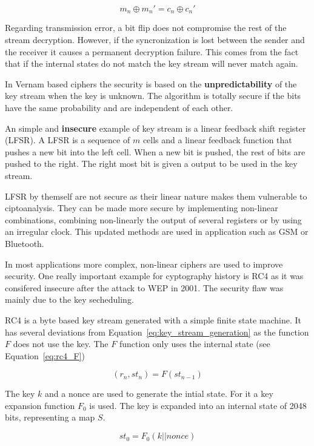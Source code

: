 \begin{equation}
m_n \oplus m_n' = c_n \oplus c_n'
\label{eq:nonce_repetition_keystream}
\end{equation}

Regarding transmission error, a bit flip does not compromise the rest of the stream decryption.
However, if the syncronization is lost between the sender and the receiver it causes a permanent decryption failure.
This comes from the fact that if the internal states do not match the key stream will never match again.

In Vernam based ciphers the security is based on the \textbf{unpredictability} of the key stream when the key is unknown.
The algorithm is totally secure if the bits have the same probability and are independent of each other.

An simple and \textbf{insecure} example of key stream is a linear feedback shift register (LFSR).
A LFSR is a sequence of $m$ cells and a linear feedback function that pushes a new bit into the left cell.
When a new bit is pushed, the rest of bits are pushed to the right.
The right most bit is given a output to be used in the key stream.

LFSR by themself are not secure as their linear nature makes them vulnerable to ciptoanalysis.
They can be made more secure by implementing non-linear combinations, combining non-linearly the output of several registers or by using an irregular clock.
This updated methods are used in application such as GSM or Bluetooth.

In most applications more complex, non-linear ciphers are used to improve security.
One really important example for cyptography history is RC4 as it was consifered insecure after the attack to WEP in 2001.
The security flaw was mainly due to the key secheduling.

RC4 is a byte based key stream generated with a simple finite state machine.
It has several deviations from Equation~\ref{eq:key_stream_generation} as the function $F$ does not use the key.
The $F$ function only uses the internal state (see Equation~\ref{eq:rc4_F})

\begin{equation}
(r_n, st_n) = F(st_{n-1})
\label{eq:rc4_F}
\end{equation}

The key $k$ and a nonce are used to generate the intial state.
For it a key expansion function $F_0$ is used.
The key is expanded into an internal state of 2048 bits, representing a map $S$.

\begin{equation}
st_0 = F_0(k||nonce)
\label{eq:rc4_F0}
\end{equation}
